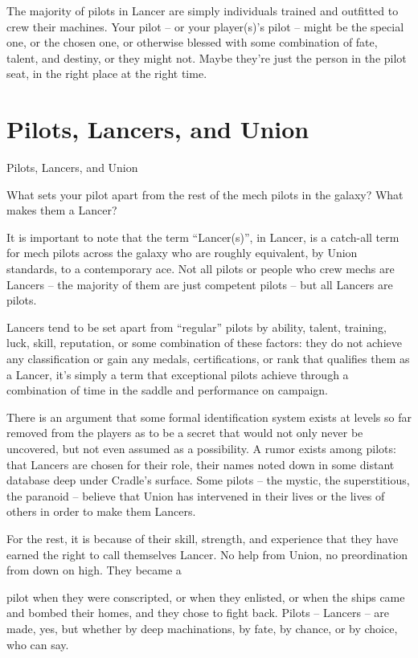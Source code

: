 The majority of pilots in Lancer are simply individuals trained and outfitted to crew their  
machines. Your pilot -- or your player(s)’s pilot -- might be the special one, or the chosen one, or  
otherwise blessed with some combination of fate, talent, and destiny, or they might not. Maybe  
they’re just the person in the pilot seat, in the right place at the right time.   
\section{Pilots, Lancers, and Union}
Pilots, Lancers, and Union  
   
What sets your pilot apart from the rest of the mech pilots in the galaxy? What makes them a  
Lancer?  

It is important to note that the term “Lancer(s)”, in Lancer, is a catch-all term for mech pilots  
across the galaxy who are roughly equivalent, by Union standards, to a contemporary ace. Not all  
pilots or people who crew mechs are Lancers -- the majority of them are just competent pilots --  
but all Lancers are pilots.   

Lancers tend to be set apart from “regular” pilots by ability, talent, training, luck, skill, reputation, or  
some combination of these factors: they do not achieve any classification or gain any medals,  
certifications, or rank that qualifies them as a Lancer, it’s simply a term that exceptional pilots  
achieve through a combination of time in the saddle and performance on campaign.   

There is an argument that some formal identification system exists at levels so far removed from  
the players as to be a secret that would not only never be uncovered, but not even assumed as a  
possibility. A rumor exists among pilots: that Lancers are chosen for their role, their names noted  
down in some distant database deep under Cradle’s surface. Some pilots -- the mystic, the  
superstitious, the paranoid -- believe that Union has intervened in their lives or the lives of others  
in order to make them Lancers.  

For the rest, it is because of their skill, strength, and experience that they have earned the right to  
call themselves Lancer. No help from Union, no preordination from down on high. They became a  

                                                                                                                      


pilot when they were conscripted, or when they enlisted, or when the ships came and bombed  
their homes, and they chose to fight back. Pilots -- Lancers -- are made, yes, but whether by deep  
machinations, by fate, by chance, or by choice, who can say.   

